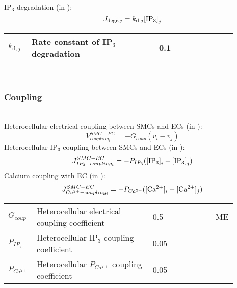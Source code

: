 \\
%
IP$_{3}$ degradation (in \uMs):  
\begin{equation} \label{eq:Jdegradj}
J_{\text{degr},j}= k_{\text{d},j} \text{[IP$_3$]}_{j}
\end{equation}
%
\begin{table}[h!]
\centering
\begin{tabular}{ p{0.09\linewidth}  >{\footnotesize} p{0.5\linewidth}  >{\footnotesize} p{0.27\linewidth} >{\footnotesize} p{0.03\linewidth} }
\hline
$k_{\text{d},j}$      			& Rate constant of IP$_{3}$ degradation						 		& 0.1 \pers		& \cite{Koenigsberger2006} \\
\hline
\end{tabular}
\label{tab:Jdegradj}
\end{table}
\\
%
%
\subsubsection*{Coupling}~\\
%
Heterocellular electrical coupling between SMCs and ECs (in \mVs):
\begin{equation} \label{eq:Vcouplingi}
V_{coupling_{i}}^{SMC-EC}= -G_{coup}(v_{i}-v_{j})
\end{equation}
%
Heterocellular IP$_{3}$ coupling between SMCs and ECs (in \uMs):
\begin{equation} \label{eq:JIP3couplingi}
J_{IP_{3}-coupling_{i}}^{SMC-EC}= -P_{IP_{3}}(\text{[IP$_3$]}_{i}-\text{[IP$_3$]}_{j})
\end{equation}
%
Calcium coupling with EC (in \uMs):
\begin{equation} \label{eq:JCAcouplingi}
J_{Ca^{2+}-coupling_{i}}^{SMC-EC}= -P_{Ca^{2+}}(\text{[Ca$^{2+}$]$_i$}-\text{[Ca$^{2+}$]$_j$})
\end{equation}
%
\begin{table}[h!]
\centering
\begin{tabular}{ p{0.09\linewidth}  >{\footnotesize} p{0.5\linewidth}  >{\footnotesize} p{0.27\linewidth} >{\footnotesize} p{0.03\linewidth} }
\hline
$G_{coup}$      		& Heterocellular electrical coupling coefficient		& 0.5 \pers	& ME \\
$P_{IP_{3}}$      		& Heterocellular IP$_{3}$ coupling coefficient	& 0.05 \pers	&  \cite{Koenigsberger2006} \\
$P_{Ca^{2+}}$      		& Heterocellular $P_{Ca^{2+}}$ coupling coefficient	& 0.05 \pers	&  \cite{Koenigsberger2006} \\
\hline
\end{tabular}
\label{tab:JCA3couplingi}
\end{table}
%
